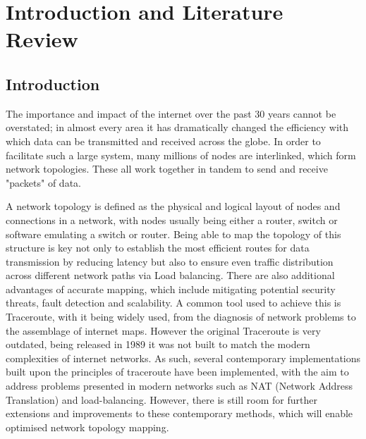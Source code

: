 \section{Introduction and Literature Review}
\subsection{Introduction}
The importance and impact of the internet over the past 30 years cannot be overstated; in almost every area it has dramatically changed the efficiency with which data can be transmitted and received across the globe. In order to facilitate such a large system, many millions of nodes are interlinked, which form network topologies. These all work together in tandem to send and receive "packets" of data. 

A network topology is defined as the physical and logical layout of nodes and connections in a network, with nodes usually being either a router, switch or software emulating a switch or router. Being able to map the topology of this structure is key not only to establish the most efficient routes for data transmission by reducing latency but also to ensure even traffic distribution across different network paths via Load balancing. There are also additional advantages of accurate mapping, which include mitigating potential security threats, fault detection and scalability. A common tool used to achieve this is Traceroute, with it being widely used, from the diagnosis of network
problems to the assemblage of internet maps. \cite{anomalies} However the original Traceroute is very outdated, being released in 1989 \cite{jacobson1989traceroute} it was not built to match the modern complexities of internet networks. As such, several contemporary implementations built upon the principles of traceroute have been implemented, with the aim to address problems presented in modern networks such as NAT (Network Address Translation) and load-balancing. However, there is still room for further extensions and improvements to these contemporary methods, which will enable optimised network topology mapping. 

